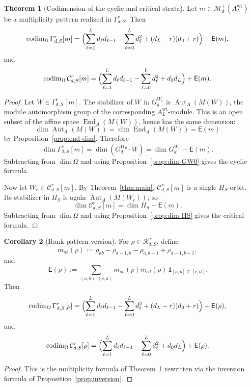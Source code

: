 \documentclass[11pt]{article}
\newcommand{\codim}{\operatorname{codim}}
\newcommand{\Aut}{\operatorname{Aut}}
\newcommand{\End}{\operatorname{End}}
\theoremstyle{definition}
\newtheorem{theorem}{Theorem}[section]
\newtheorem{corollary}[theorem]{Corollary}
\begin{document}
\begin{theorem}[Codimension of the cyclic and critical strata]
\label{thm:codim-strata}
Let \(m\in \mathcal M_d^+(A_L^{\mathrm{wt}})\) be a multiplicity pattern realized
in \(\Gamma_{d,S}^r\). Then
\[
\codim_{\Omega}\Gamma_{d,S}^r[m]
=
\Bigl(
\sum_{\ell=1}^L d_\ell d_{\ell-1}
-\sum_{\ell=0}^L d_\ell^2
+(d_L-r)(d_0+r)
\Bigr)
+
\mathsf E(m),
\]
and
\[
\codim_{\Omega}\mathcal C_{d,S}^r[m]
=
\Bigl(
\sum_{\ell=1}^L d_\ell d_{\ell-1}
-\sum_{\ell=0}^L d_\ell^2
+d_0d_L
\Bigr)
+
\mathsf E(m).
\]
\end{theorem}

\begin{proof}
Let \(W\in \Gamma_{d,S}^r[m]\). The stabilizer of \(W\) in \(G_d^{W_0}\) is
\(\Aut_A(M(W))\), the module automorphism group of the corresponding
\(A_L^{\mathrm{wt}}\)-module. This is an open subset of the affine space
\(\End_A(M(W))\), hence has the same dimension:
\[
\dim \Aut_A(M(W))=\dim \End_A(M(W))=\mathsf E(m)
\]
by Proposition~\ref{prop:end-dim}. Therefore
\[
\dim \Gamma_{d,S}^r[m]
=
\dim(G_d^{W_0}\cdot W)
=
\dim G_d^{W_0}-\mathsf E(m).
\]
Subtracting from \(\dim \Omega\) and using Proposition~\ref{prop:dim-GW0} gives
the cyclic formula.

Now let \(W_c\in \mathcal C_{d,S}^r[m]\). By Theorem~\ref{thm:main},
\(\mathcal C_{d,S}^r[m]\) is a single \(H_S\)-orbit. Its stabilizer in \(H_S\)
is again \(\Aut_A(M(W_c))\), so
\[
\dim \mathcal C_{d,S}^r[m]
=
\dim H_S-\mathsf E(m).
\]
Subtracting from \(\dim \Omega\) and using Proposition~\ref{prop:dim-HS} gives
the critical formula.
\end{proof}

\begin{corollary}[Rank-pattern version]
\label{cor:codim-rank}
For \(\rho\in \mathcal R_{d,S}^{\,r}\), define
\[
m_{ab}(\rho):=\rho_{ab}-\rho_{a-1,b}-\rho_{a,b+1}+\rho_{a-1,b+1},
\]
and
\[
\mathsf E(\rho)
:=
\sum_{(a,b),(c,d)}
m_{ab}(\rho)m_{cd}(\rho)\,\mathbf 1_{[a,b]\subseteq [c,d]}.
\]
Then
\[
\codim_{\Omega}\Gamma_{d,S}^r[\rho]
=
\Bigl(
\sum_{\ell=1}^L d_\ell d_{\ell-1}
-\sum_{\ell=0}^L d_\ell^2
+(d_L-r)(d_0+r)
\Bigr)
+
\mathsf E(\rho),
\]
and
\[
\codim_{\Omega}\mathcal C_{d,S}^r[\rho]
=
\Bigl(
\sum_{\ell=1}^L d_\ell d_{\ell-1}
-\sum_{\ell=0}^L d_\ell^2
+d_0d_L
\Bigr)
+
\mathsf E(\rho).
\]
\end{corollary}

\begin{proof}
This is the multiplicity formula of Theorem~\ref{thm:codim-strata} rewritten
via the inversion formula of Proposition~\ref{prop:inversion}.
\end{proof}
\end{document}
